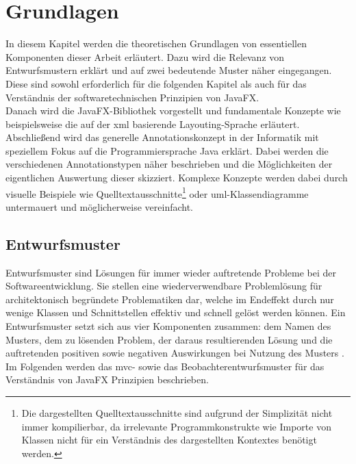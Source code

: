 \chapter{Grundlagen}
\label{grundlagen}
\noindent In diesem Kapitel werden die theoretischen Grundlagen von essentiellen Komponenten dieser Arbeit erläutert. Dazu wird die Relevanz von Entwurfsmustern erklärt und auf zwei bedeutende Muster näher eingegangen. Diese sind sowohl erforderlich für die folgenden Kapitel als auch für das Verständnis der softwaretechnischen Prinzipien von JavaFX.\\
Danach wird die JavaFX-Bibliothek vorgestellt und fundamentale Konzepte wie beispielsweise die auf der \ac{xml} basierende Layouting-Sprache erläutert.\\
Abschließend wird das generelle Annotationskonzept in der Informatik mit speziellem Fokus auf die Programmiersprache Java erklärt. Dabei werden die verschiedenen Annotationstypen näher beschrieben und die Möglichkeiten der eigentlichen Auswertung dieser skizziert. Komplexe Konzepte werden dabei durch visuelle Beispiele wie Quelltextausschnitte\footnote{Die dargestellten Quelltextausschnitte sind aufgrund der Simplizität nicht immer kompilierbar, da irrelevante Programmkonstrukte wie Importe von Klassen nicht für ein Verständnis des dargestellten Kontextes benötigt werden.} oder \ac{uml}-Klassendiagramme untermauert und möglicherweise vereinfacht. 

\section{Entwurfsmuster}
\label{entwurfsmuster}
Entwurfsmuster sind Lösungen für immer wieder auftretende Probleme bei der Softwareentwicklung. Sie stellen eine wiederverwendbare Problemlösung für architektonisch begründete Problematiken dar, welche im Endeffekt durch nur wenige Klassen und Schnittstellen effektiv und schnell gelöst werden können. Ein Entwurfsmuster setzt sich aus vier Komponenten zusammen: dem Namen des Musters, dem zu lösenden Problem, der daraus resultierenden Lösung und die auftretenden positiven sowie negativen Auswirkungen bei Nutzung des Musters \cite{Gamma1993}.\\
Im Folgenden werden das \ac{mvc}- sowie das Beobachterentwurfsmuster für das Verständnis von JavaFX Prinzipien beschrieben.
